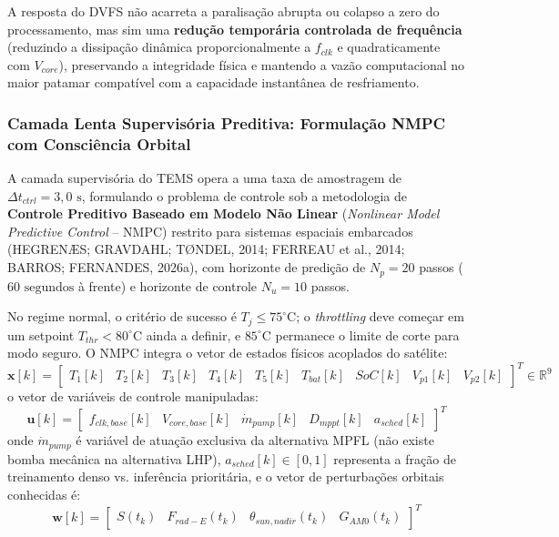 A resposta do DVFS não acarreta a paralisação abrupta ou colapso a zero do processamento, mas sim uma \textbf{redução temporária controlada de frequência} (reduzindo a dissipação dinâmica proporcionalmente a $f_{clk}$ e quadraticamente com $V_{core}$), preservando a integridade física e mantendo a vazão computacional no maior patamar compatível com a capacidade instantânea de resfriamento.

\subsubsection{Camada Lenta Supervisória Preditiva: Formulação NMPC com Consciência Orbital}

A camada supervisória do TEMS opera a uma taxa de amostragem de $\Delta t_{ctrl} = 3{,}0\text{ s}$, formulando o problema de controle sob a metodologia de \textbf{Controle Preditivo Baseado em Modelo Não Linear} (\textit{Nonlinear Model Predictive Control} -- NMPC) restrito para sistemas espaciais embarcados (HEGRENÆS; GRAVDAHL; TØNDEL, 2014; FERREAU et al., 2014; BARROS; FERNANDES, 2026a), com horizonte de predição de $N_p = 20$ passos ($60\text{ segundos}$ à frente) e horizonte de controle $N_u = 10$ passos.

No regime normal, o critério de sucesso é $T_j\le75^\circ\text{C}$; o \textit{throttling} deve começar em um setpoint $T_{thr}<80^\circ\text{C}$ ainda a definir, e $85^\circ\text{C}$ permanece o limite de corte para modo seguro. O NMPC integra o vetor de estados físicos acoplados do satélite:
\begin{equation}
    \mathbf{x}[k] = \begin{bmatrix} T_1[k] & T_2[k] & T_3[k] & T_4[k] & T_5[k] & T_{bat}[k] & SoC[k] & V_{p1}[k] & V_{p2}[k] \end{bmatrix}^T \in \mathbb{R}^9
    \label{eq:vetor_estados_nmpc}
\end{equation}
o vetor de variáveis de controle manipuladas:
\begin{equation}
    \mathbf{u}[k] = \begin{bmatrix} f_{clk,base}[k] & V_{core,base}[k] & \dot{m}_{pump}[k] & D_{mppt}[k] & a_{sched}[k] \end{bmatrix}^T
    \label{eq:vetor_controle_nmpc_completo}
\end{equation}
onde $\dot{m}_{pump}$ é variável de atuação exclusiva da alternativa MPFL (não existe bomba mecânica na alternativa LHP), $a_{sched}[k]\in[0,1]$ representa a fração de treinamento denso vs. inferência prioritária, e o vetor de perturbações orbitais conhecidas é:
\begin{equation}
    \mathbf{w}[k] = \begin{bmatrix} S(t_k) & F_{rad-E}(t_k) & \theta_{sun,nadir}(t_k) & G_{AM0}(t_k) \end{bmatrix}^T
    \label{eq:vetor_perturbacoes_orbitais}
\end{equation}

